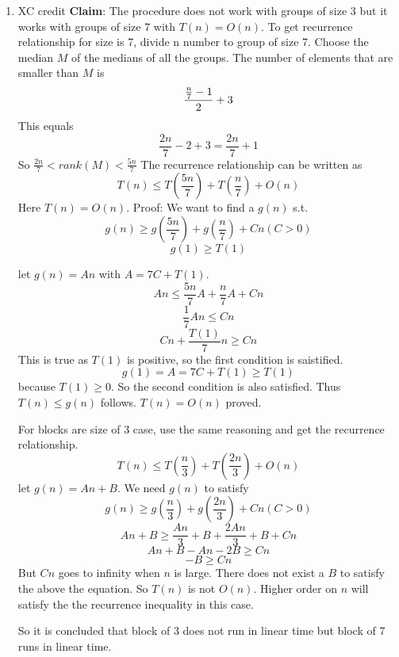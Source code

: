 \documentclass[11pt]{article}
\begin{document}
\begin{enumerate}
\pagebreak

\item XC credit
\textbf{Claim}: The procedure does not work with groups of size 3 but it works with groups of size 7 with $T(n) = O(n)$. To get recurrence relationship for size is 7, divide n number to group of size 7. Choose the median $M$ of the medians of all the groups. The number of elements that are smaller than $M$ is
\[\frac{{\frac{n}{7}-1}}{2} \time 4 + 3\]
This equals \[\frac{2n}{7}-2+3 = \frac{2n}{7}+1\]
So $ \frac{2n}{7} < rank(M) < \frac{5n}{7}$ 
The recurrence relationship can be written as  
\[ T(n) \leq T(\frac{5n}{7}) + T(\frac{n}{7}) + O(n)\]
Here $T(n) = O(n)$. Proof:
We want to find a $g(n)$ s.t. 
\[g(n) \geq g(\frac{5n}{7}) + g(\frac{n}{7}) + Cn (C>0)\]
\[g(1) \geq T(1)\]

let $g(n) = An$ with $A=7C+T(1)$. 
\[ An \leq \frac{5n}{7}A+\frac{n}{7}A+Cn\]
\[ \frac{1}{7}An \leq Cn\]
\[ Cn + \frac{T(1)}{7}n \geq Cn\]
This is true as $T(1)$ is positive, so the first condition is saistified. 
\[ g(1) = A = 7C+T(1) \geq T(1)\]
because $T(1) \geq 0$. So the second condition is also satisfied. Thus $T(n) \leq g(n)$ follows. $T(n) = O(n)$ proved.

For blocks are  size of 3 case, use the same reasoning and get the recurrence relationship.
\[T(n) \leq T(\frac{n}{3}) + T(\frac{2n}{3}) + O(n)\]
let $g(n) = An + B$. We need $g(n)$ to satisfy
\[g(n) \geq g(\frac{n}{3}) + g(\frac{2n}{3}) + Cn (C>0)\]
\[An+B \geq \frac{An}{3}+B+\frac{2An}{3}+B+Cn\]
\[An+B-An-2B \geq Cn\]
\[-B \geq Cn\]
But $Cn$ goes to infinity when $n$ is large. There does not exist a $B$ to satisfy the above the equation. So $T(n)$ is not $O(n)$. Higher order on $n$ will satisfy the the recurrence inequality in this case.

So it is concluded that block of 3 does not run in linear time but block of 7 runs in linear time.





\end{enumerate}
\end{document}
